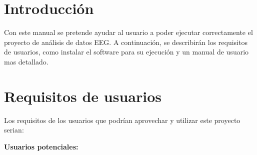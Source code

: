 
\section{Introducción}


Con este manual se pretende ayudar al usuario a poder ejecutar correctamente el proyecto de análisis de datos EEG. A continuación, se describirán los requisitos de usuarios, como instalar el software para su ejecución y un manual de usuario mas detallado.


\section{Requisitos de usuarios}


Los requisitos de los usuarios que podrían aprovechar y utilizar este proyecto serian:

\textbf{Usuarios potenciales:} 


